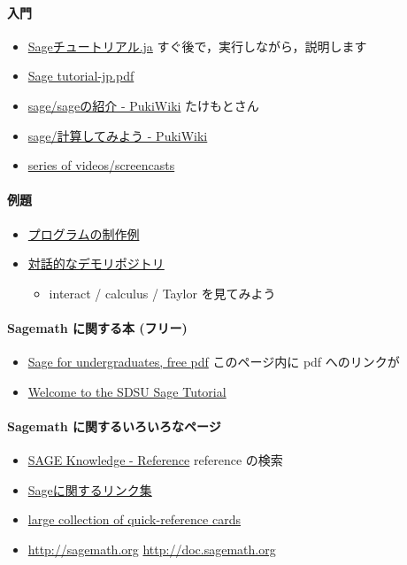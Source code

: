 \documentclass[dvipdfmx,11pat]{jarticle}
\begin{document}
\paragraph{入門}
\label{sec:orgcffd127}
\begin{itemize}
\item \href{http://doc.sagemath.org/html/ja/tutorial/index.html}{Sageチュートリアル.ja} すぐ後で，実行しながら，説明します
\item \href{http://doc.sagemath.org/pdf/ja/tutorial/tutorial-jp.pdf}{Sage tutorial-jp.pdf}
\item \href{http://www.pwv.co.jp/\%7Etake/TakeWiki/index.php?sage\%2Fsage\%E3\%81\%AE\%E7\%B4\%B9\%E4\%BB\%8B}{sage/sageの紹介 - PukiWiki} たけもとさん
\item \href{http://www.pwv.co.jp/\~take/TakeWiki/index.php?sage\%2F\%E8\%A8\%88\%E7\%AE\%97\%E3\%81\%97\%E3\%81\%A6\%E3\%81\%BF\%E3\%82\%88\%E3\%81\%86}{sage/計算してみよう - PukiWiki}
\item \href{http://www.sagemath.org/help-video.html}{series of videos/screencasts}
\end{itemize}
\paragraph{例題}
\label{sec:orgc747490}
\begin{itemize}
\item \href{http://doc.sagemath.org/html/en/constructions/index.html}{プログラムの制作例}
\item \href{https://wiki.sagemath.org/interact}{対話的なデモリポジトリ} 
\begin{itemize}
\item interact / calculus / Taylor  を見てみよう
\end{itemize}
\end{itemize}
\paragraph{Sagemath に関する本 (フリー)}
\label{sec:org3f42eee}
\begin{itemize}
\item \href{http://www.gregorybard.com/Sage.html}{Sage for undergraduates, free pdf}   このページ内に pdf へのリンクが
\item \href{http://mosullivan.sdsu.edu/Teaching/sdsu-sage-tutorial/index.html}{Welcome to the SDSU Sage Tutorial}
\end{itemize}
\paragraph{Sagemath に関するいろいろなページ}
\label{sec:org538e051}
\begin{itemize}
\item \href{http://sk.sagepub.com/reference}{SAGE Knowledge - Reference} reference の検索
\item \href{https://qiita.com/HirofumiYashima/items/6bb5770961a3b7d33118}{Sageに関するリンク集}
\item \href{http://wiki.sagemath.org/quickref}{large collection of quick-reference cards}
\item \url{http://sagemath.org} \url{http://doc.sagemath.org}
\end{itemize}
\end{document}
